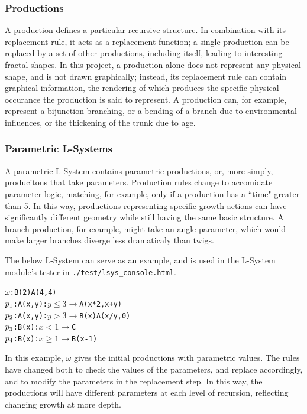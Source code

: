\documentclass{article}
\newcommand{\tab}{\hspace*{2em}}
\begin{document}
            \subsubsection{Productions}
    \tab A production defines a particular recursive structure. In combination with its replacement
rule, it acts as a replacement function; a single production can be replaced by a set of
other productions, including itself, leading to interesting fractal shapes. In this project, a
production alone does not represent any physical shape, and is not drawn graphically; instead, its 
replacement rule can contain graphical information, the rendering of which produces the specific
physical occurance the production is said to represent. A production can, for example, represent a
bijunction branching, or a bending of a branch due to environmental influences, or the thickening of
the trunk due to age.

            \subsubsection{Parametric L-Systems}
    \tab A parametric L-System contains parametric productions, or, more simply, producitons that
take parameters. Production rules change to accomidate parameter logic, matching, for example, only
if a production has a ``time" greater than 5. In this way, productions representing specific growth
actions can have significantly different geometry while still having the same basic structure. A
branch production, for example, might take an angle parameter, which would make larger branches
diverge less dramaticaly than twigs.

    \tab The below L-System can serve as an example, and is used in the L-System module's tester in
\verb|./test/lsys_console.html|\cite{abp96}.
    \begin{alltt}
    \(\omega\) : B(2)A(4,4)
    \(p\sb{1}\) : A(x,y) : \(y \leq 3 \rightarrow\) A(x*2, x+y)
    \(p\sb{2}\) : A(x,y) : \(y > 3 \rightarrow\) B(x)A(x/y, 0)
    \(p\sb{3}\) : B(x)   : \(x < 1 \rightarrow\) C
    \(p\sb{4}\) : B(x)   : \(x \geq 1 \rightarrow\) B(x-1)   
    \end{alltt}
In this example, $\omega$ gives the initial productions with parametric values. The rules have
changed both to check the values of the parameters, and replace accordingly, and to modify the
parameters in the replacement step. In this way, the productions will have different parameters at
each level of recursion, reflecting changing growth at more depth.
\end{document}

